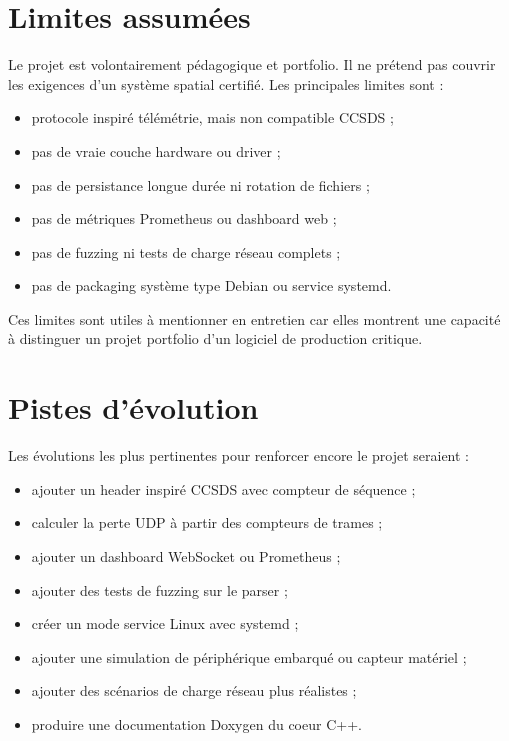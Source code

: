 \documentclass[11pt,a4paper]{article}
\begin{document}
\section{Limites assumées}

Le projet est volontairement pédagogique et portfolio. Il ne prétend pas couvrir les exigences d'un système spatial certifié. Les principales limites sont :

\begin{itemize}[nosep]
    \item protocole inspiré télémétrie, mais non compatible CCSDS ;
    \item pas de vraie couche hardware ou driver ;
    \item pas de persistance longue durée ni rotation de fichiers ;
    \item pas de métriques Prometheus ou dashboard web ;
    \item pas de fuzzing ni tests de charge réseau complets ;
    \item pas de packaging système type Debian ou service systemd.
\end{itemize}

Ces limites sont utiles à mentionner en entretien car elles montrent une capacité à distinguer un projet portfolio d'un logiciel de production critique.

\section{Pistes d'évolution}

Les évolutions les plus pertinentes pour renforcer encore le projet seraient :

\begin{itemize}[nosep]
    \item ajouter un header inspiré CCSDS avec compteur de séquence ;
    \item calculer la perte UDP à partir des compteurs de trames ;
    \item ajouter un dashboard WebSocket ou Prometheus ;
    \item ajouter des tests de fuzzing sur le parser ;
    \item créer un mode service Linux avec systemd ;
    \item ajouter une simulation de périphérique embarqué ou capteur matériel ;
    \item ajouter des scénarios de charge réseau plus réalistes ;
    \item produire une documentation Doxygen du coeur C++.
\end{itemize}
\end{document}
